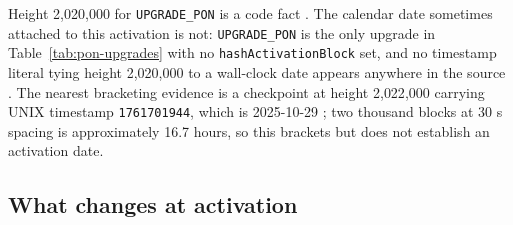 Height 2{,}020{,}000 for \texttt{UPGRADE\_PON} is a code fact \shipped {}.
The calendar date sometimes attached to this activation is not: \texttt{UPGRADE\_PON} is the only
upgrade in Table~\ref{tab:pon-upgrades} with no \texttt{hash\allowbreak{}Activation\allowbreak{}Block} set, and no timestamp
literal tying height 2{,}020{,}000 to a wall-clock date appears anywhere in the source
\shipped {}. The nearest bracketing evidence is a
checkpoint at height 2{,}022{,}000 carrying UNIX timestamp \texttt{1761701944}, which is 2025-10-29
\shipped {}; two thousand blocks at 30 s spacing is
approximately 16.7 hours, so this brackets but does not establish an activation date.

\subsection{What changes at \PoN activation}
\label{sec:consensus-changes}

